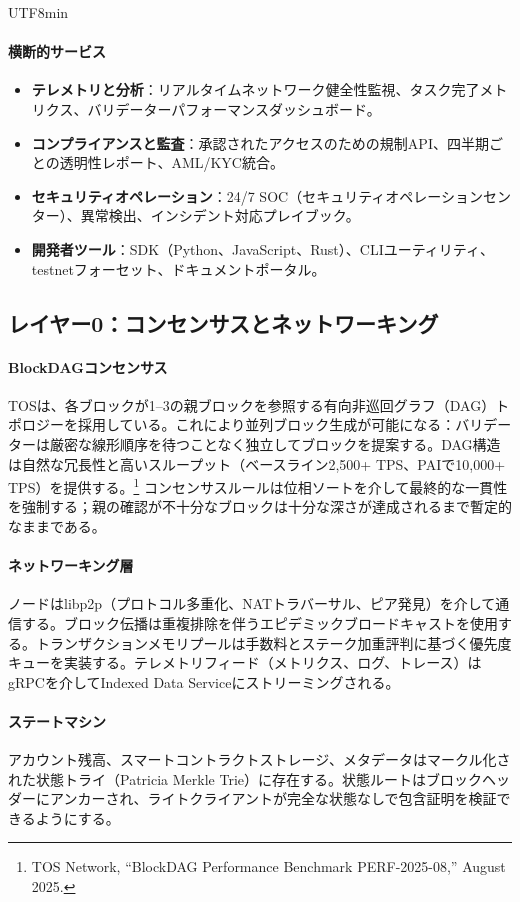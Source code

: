 \documentclass[11pt]{article}
\begin{document}
\begin{CJK}{UTF8}{min}
\paragraph{横断的サービス}
\begin{itemize}[noitemsep]
  \item \textbf{テレメトリと分析}：リアルタイムネットワーク健全性監視、タスク完了メトリクス、バリデーターパフォーマンスダッシュボード。
  \item \textbf{コンプライアンスと監査}：承認されたアクセスのための規制API、四半期ごとの透明性レポート、AML/KYC統合。
  \item \textbf{セキュリティオペレーション}：24/7 SOC（セキュリティオペレーションセンター）、異常検出、インシデント対応プレイブック。
  \item \textbf{開発者ツール}：SDK（Python、JavaScript、Rust）、CLIユーティリティ、testnetフォーセット、ドキュメントポータル。
\end{itemize}

\subsection{レイヤー0：コンセンサスとネットワーキング}
\paragraph{BlockDAGコンセンサス} TOSは、各ブロックが1--3の親ブロックを参照する有向非巡回グラフ（DAG）トポロジーを採用している。これにより並列ブロック生成が可能になる：バリデーターは厳密な線形順序を待つことなく独立してブロックを提案する。DAG構造は自然な冗長性と高いスループット（ベースライン2,500+ TPS、PAIで10,000+ TPS）を提供する。\footnote{TOS Network, ``BlockDAG Performance Benchmark PERF-2025-08,'' August 2025.} コンセンサスルールは位相ソートを介して最終的な一貫性を強制する；親の確認が不十分なブロックは十分な深さが達成されるまで暫定的なままである。

\paragraph{ネットワーキング層} ノードはlibp2p（プロトコル多重化、NATトラバーサル、ピア発見）を介して通信する。ブロック伝播は重複排除を伴うエピデミックブロードキャストを使用する。トランザクションメモリプールは手数料とステーク加重評判に基づく優先度キューを実装する。テレメトリフィード（メトリクス、ログ、トレース）はgRPCを介してIndexed Data Serviceにストリーミングされる。

\paragraph{ステートマシン} アカウント残高、スマートコントラクトストレージ、メタデータはマークル化された状態トライ（Patricia Merkle Trie）に存在する。状態ルートはブロックヘッダーにアンカーされ、ライトクライアントが完全な状態なしで包含証明を検証できるようにする。


\end{CJK}
\end{document}
